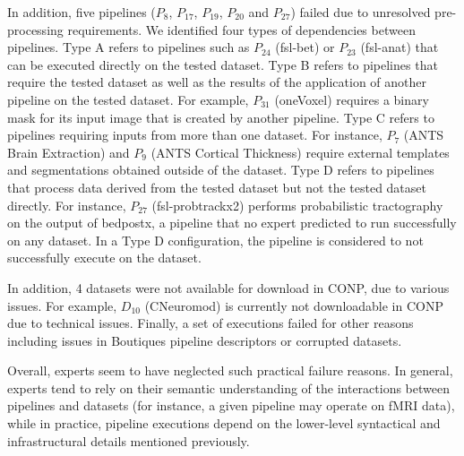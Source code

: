 In addition, five pipelines ($P_{8}$, $P_{17}$, $P_{19}$, $P_{20}$ and
$P_{27}$) failed due to unresolved pre-processing requirements. We
identified four types of dependencies between pipelines. Type A refers to pipelines such
as $P_{24}$ (fsl-bet) or $P_{23}$ (fsl-anat) that can be executed directly
on the tested dataset. Type B refers to pipelines that require the tested
dataset as well as the results of the application of another pipeline on
the tested dataset. For example, $P_{31}$ (oneVoxel) requires a binary mask
for its input image that is created by another pipeline. Type C refers
to pipelines requiring inputs from more than one dataset. For instance, $P_7$
(ANTS Brain Extraction) and $P_9$ (ANTS Cortical Thickness) require
external templates and segmentations obtained outside of the dataset. Type
D refers to pipelines that process data derived from the tested dataset but not
the tested dataset directly.  For instance, $P_{27}$ (fsl-probtrackx2) performs
probabilistic tractography on the output of bedpostx, a pipeline that
no expert predicted to run successfully on any dataset. In a Type D
configuration, the pipeline is considered to not successfully execute on
the dataset. 

In addition, 4 datasets were not available for download in CONP, due to
various issues. For example, $D_{10}$ (CNeuromod) is currently not
downloadable in CONP due to technical issues.
Finally, a set of executions failed for other reasons including issues in
Boutiques pipeline descriptors or corrupted datasets.


Overall, experts seem to have neglected such practical failure reasons. In
general, experts tend to rely on their semantic understanding of the
interactions between pipelines and datasets (for instance, a given pipeline
may operate on fMRI data), while in practice, pipeline executions depend on
the lower-level syntactical and infrastructural details mentioned previously.



